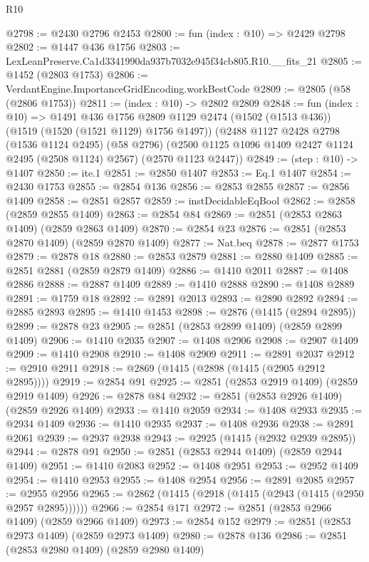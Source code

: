 \begin{lexlean}{R10}
\begin{coremodule}
@2798 := @2430 @2796 @2453
@2800 := fun (index : @10) => @2429 @2798
@2802 := @1447 @436 @1756
@2803 := LexLeanPreserve.Ca1d3341990da937b7032e945f34cb805.R10.__fits_21
@2805 := @1452 (@2803 @1753)
@2806 := VerdantEngine.ImportanceGridEncoding.workBestCode
@2809 := @2805 (@58 (@2806 @1753))
@2811 := (index : @10) -> @2802 @2809
@2848 := fun (index : @10) =>
  @1491
    @436
    @1756
    @2809
    @1129
    @2474
    (@1502 (@1513 @436))
    (@1519 (@1520 (@1521 @1129) @1756 @1497))
    (@2488
      @1127
      @2428
      @2798
      (@1536 @1124 @2495)
      (@58 @2796)
      (@2500 @1125 @1096 @1409 @2427 @1124 @2495 (@2508 @1124) @2567)
      (@2570 @1123 @2447))
@2849 := (step : @10) -> @1407
@2850 := ite.{1}
@2851 := @2850 @1407
@2853 := Eq.{1} @1407
@2854 := @2430 @1753
@2855 := @2854 @136
@2856 := @2853 @2855
@2857 := @2856 @1409
@2858 := @2851 @2857
@2859 := instDecidableEqBool
@2862 := @2858 (@2859 @2855 @1409)
@2863 := @2854 @84
@2869 := @2851 (@2853 @2863 @1409) (@2859 @2863 @1409)
@2870 := @2854 @23
@2876 := @2851 (@2853 @2870 @1409) (@2859 @2870 @1409)
@2877 := Nat.beq
@2878 := @2877 @1753
@2879 := @2878 @18
@2880 := @2853 @2879
@2881 := @2880 @1409
@2885 := @2851 @2881 (@2859 @2879 @1409)
@2886 := @1410 @2011
@2887 := @1408 @2886
@2888 := @2887 @1409
@2889 := @1410 @2888
@2890 := @1408 @2889
@2891 := @1759 @18
@2892 := @2891 @2013
@2893 := @2890 @2892
@2894 := @2885 @2893
@2895 := @1410 @1453
@2898 := @2876 (@1415 (@2894 @2895))
@2899 := @2878 @23
@2905 := @2851 (@2853 @2899 @1409) (@2859 @2899 @1409)
@2906 := @1410 @2035
@2907 := @1408 @2906
@2908 := @2907 @1409
@2909 := @1410 @2908
@2910 := @1408 @2909
@2911 := @2891 @2037
@2912 := @2910 @2911
@2918 := @2869 (@1415 (@2898 (@1415 (@2905 @2912 @2895))))
@2919 := @2854 @91
@2925 := @2851 (@2853 @2919 @1409) (@2859 @2919 @1409)
@2926 := @2878 @84
@2932 := @2851 (@2853 @2926 @1409) (@2859 @2926 @1409)
@2933 := @1410 @2059
@2934 := @1408 @2933
@2935 := @2934 @1409
@2936 := @1410 @2935
@2937 := @1408 @2936
@2938 := @2891 @2061
@2939 := @2937 @2938
@2943 := @2925 (@1415 (@2932 @2939 @2895))
@2944 := @2878 @91
@2950 := @2851 (@2853 @2944 @1409) (@2859 @2944 @1409)
@2951 := @1410 @2083
@2952 := @1408 @2951
@2953 := @2952 @1409
@2954 := @1410 @2953
@2955 := @1408 @2954
@2956 := @2891 @2085
@2957 := @2955 @2956
@2965 := @2862 (@1415 (@2918 (@1415 (@2943 (@1415 (@2950 @2957 @2895))))))
@2966 := @2854 @171
@2972 := @2851 (@2853 @2966 @1409) (@2859 @2966 @1409)
@2973 := @2854 @152
@2979 := @2851 (@2853 @2973 @1409) (@2859 @2973 @1409)
@2980 := @2878 @136
@2986 := @2851 (@2853 @2980 @1409) (@2859 @2980 @1409)

\end{coremodule}
\end{lexlean}
